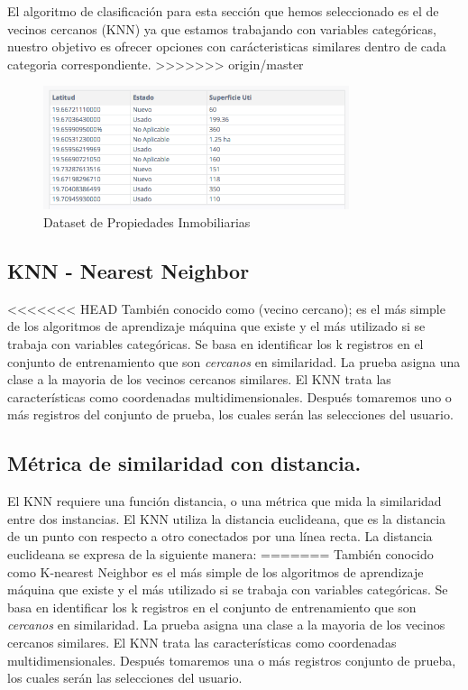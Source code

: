 El algoritmo de clasificación para esta sección que hemos seleccionado es el de vecinos cercanos (KNN) ya que estamos trabajando con variables categóricas, nuestro objetivo es ofrecer opciones con carácteristicas similares dentro de cada categoria correspondiente.
>>>>>>> origin/master
\begin{figure}[ht]
\centering
\includegraphics[width=0.8\textwidth]{Dataset.png}
\caption{Dataset de Propiedades Inmobiliarias}
\label{fig:Dataset}
\end{figure}


\subsection{KNN - Nearest Neighbor}
<<<<<<< HEAD
También conocido como (vecino cercano); es el más simple de los algoritmos de aprendizaje máquina que existe y el más utilizado si se trabaja con variables categóricas. Se basa en identificar los k  registros en el conjunto de entrenamiento que son \emph{cercanos} en similaridad. La prueba asigna una clase a la mayoria de los vecinos cercanos similares. El KNN trata las características como coordenadas multidimensionales. Después tomaremos uno o más registros del conjunto de prueba, los cuales serán las selecciones del usuario. 

\subsection{Métrica de similaridad con distancia.}

El KNN requiere una función distancia, o una métrica que mida la similaridad entre dos instancias. El KNN utiliza la distancia euclideana, que es la distancia de un punto con respecto a otro conectados por una línea recta. La distancia euclideana se expresa de la siguiente manera:
=======
También conocido como K-nearest Neighbor es el más simple de los algoritmos de aprendizaje máquina que existe y el más utilizado si se trabaja con variables categóricas. Se basa en identificar los k  registros en el conjunto de entrenamiento que son \emph{cercanos} en similaridad. La prueba asigna una clase a la mayoria de los vecinos cercanos similares. El KNN trata las características como coordenadas multidimensionales. Después tomaremos una o más registros conjunto de prueba, los cuales serán las selecciones del usuario. 

